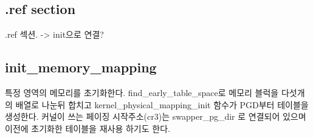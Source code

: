 \documentclass[a4paper,11pt]{report}
\begin{document}
\begin{CJK}{UTF8}{}




\subsection{.ref section}
.ref 섹션. -> init으로 연결?

\subsection{init\_memory\_mapping}
특정 영역의 메모리를 초기화한다.
find\_early\_table\_space로 메모리 블럭을 다섯개의 배열로 나눈뒤 합치고 kernel\_physical\_mapping\_init 함수가 PGD부터 테이블을 생성한다.
커널이 쓰는 페이징 시작주소(cr3)는 swapper\_pg\_dir 로 연결되어 있으며 이전에 초기화한 테이블을 재사용 하기도 한다.


\end{CJK}
\end{document}
